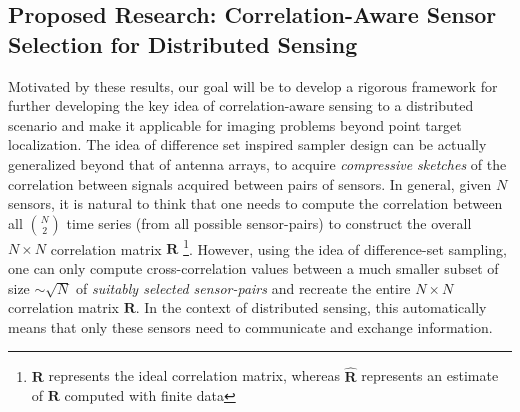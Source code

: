 \subsection{Proposed Research: Correlation-Aware Sensor Selection for Distributed Sensing} Motivated by these results, our goal will be to develop a rigorous framework for further developing the key idea of correlation-aware sensing to a distributed scenario and make it applicable for imaging problems beyond point target localization.
The idea of difference set inspired sampler design can be actually generalized beyond that of antenna arrays, to acquire {\em compressive sketches} of the correlation between signals acquired between pairs of sensors. In general, given $N$ sensors, it is natural to think that one needs to compute the correlation between all $N\choose 2$ time series (from all possible sensor-pairs) to construct the overall $N\times N$ correlation matrix $\mathbf{R}$ \footnote{$\mathbf{R}$ represents the ideal correlation matrix, whereas $\mathbf{\hat{R}}$ represents an estimate of $\mathbf{R}$ computed with finite data}. However, using the idea of difference-set sampling, one can only compute  cross-correlation values between a much smaller subset of size $\sim\sqrt{N}$ of {\em suitably selected sensor-pairs} and recreate the entire $N\times N$ correlation matrix $\mathbf{R}$. In the context of distributed sensing, this automatically means that only these sensors need to communicate and exchange information.

